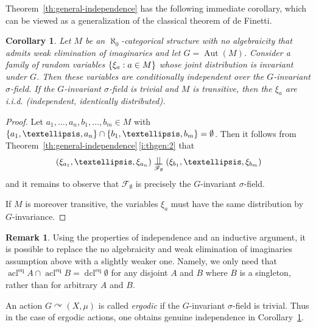 \documentclass[11pt]{article}
\let\mathcal\mathscr
\let\actson\curvearrowright
\theoremstyle{plain}
\newtheorem{cor}[theorem]{Corollary}
\theoremstyle{definition}
\newtheorem{remark}[theorem]{Remark}
\newcommand{\cF}{\mathcal{F}}
\DeclareMathOperator{\acl}{acl}
\DeclareMathOperator{\Aut}{Aut}
\DeclareMathOperator{\dcl}{dcl}
\DeclarePairedDelimiter\set{\{}{\}}
\newcommand{\eq}{^{\mathrm{eq}}}
\newcommand{\indep}[1][]{%
  \mathrel{
    \mathop{
      \scalebox{1}[1.3]{\text{$\perp\!\!\!\perp$}}
    }\displaylimits_{#1}
  }
}
\begin{document}
Theorem~\ref{th:general-independence} has the following immediate corollary, which can be viewed as a generalization of the classical theorem of de Finetti.
\begin{cor}
\label{c:deFinetti}
Let $M$ be an $\aleph_0$-categorical structure with no algebraicity that admits weak elimination of imaginaries and let $G = \Aut(M)$. Consider a family of random variables $\set{\xi_a : a \in M}$ whose joint distribution is invariant under $G$. Then these variables are conditionally independent over the $G$-invariant $\sigma$-field. If the $G$\nobreakdash-invariant $\sigma$-field is trivial and $M$ is transitive, then the $\xi_a$ are \emph{i.i.d.} (independent, identically distributed).
\end{cor}
\begin{proof}
Let $a_1, \ldots, a_n, b_1, \ldots, b_m \in M$ with $\set{a_1, \ldots, a_n} \cap \set{b_1, \ldots, b_m} = \emptyset$. Then it follows from Theorem~\ref{th:general-independence}\,\eqref{i:thgen:2} that
\begin{equation*}
(\xi_{a_1},\ldots, \xi_{a_n}) \indep[\mathcal{F}_\emptyset] (\xi_{b_1},\ldots, \xi_{b_m})
\end{equation*}
and it remains to observe that $\cF_\emptyset$ is precisely the $G$-invariant $\sigma$-field.

If $M$ is moreover transitive, the variables $\xi_a$ must have the same distribution by $G$-invariance.
\end{proof}

\begin{remark}
\label{rem:dF-weaker-assumption}
Using the properties of independence and an inductive argument, it is possible to replace the no algebraicity and weak elimination of imaginaries assumption above with a slightly weaker one. Namely, we only need that $\acl\eq A \cap \acl\eq B = \dcl\eq \emptyset$ for any disjoint $A$ and $B$ where $B$ is a singleton, rather than for arbitrary $A$ and $B$.
\end{remark}

An action $G \actson (X, \mu)$ is called \emph{ergodic} if the $G$-invariant $\sigma$-field is trivial. Thus in the case of ergodic actions, one obtains genuine independence in Corollary~\ref{c:deFinetti}.
\end{document}
